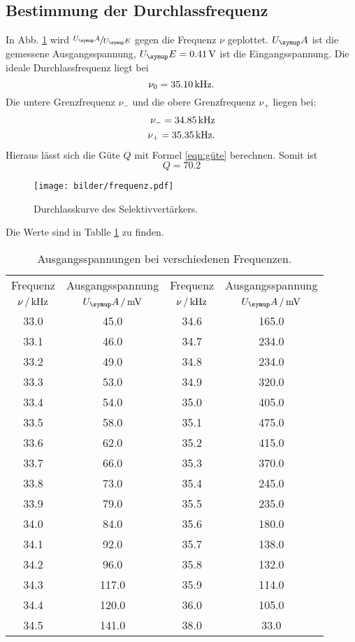 \subsection{Bestimmung der Durchlassfrequenz}
In Abb. \ref{fig:Durchlass} wird $\sfrac{U_\su{A}}{U_\su{E}}$ gegen die Frequenz
$\nu$ geplottet. $U_\su{A}$ ist die gemessene Ausgangsspannung, $U_\su{E} = 0.41\,\si{\volt}$
ist die Eingangsspannung.
Die ideale Durchlassfrequenz liegt bei
\begin{equation}
  \nu_0 = 35.10 \,\si{\kilo\hertz}.
\end{equation}
Die untere Grenzfrequenz $\nu_-$ und die obere Grenzfrequenz $\nu_+$ liegen bei:
\begin{align}
  \nu_- = 34.85 \,\si{\kilo\hertz} \\
  \nu_+ = 35.35 \,\si{\kilo\hertz}.
\end{align}
Hieraus lässt sich die Güte $Q$ mit Formel \eqref{eqn:güte} berechnen. Somit ist
\begin{equation*}
  Q=70.2
\end{equation*}
\begin{figure}[H]
  \centering
  \texttt{[image: bilder/frequenz.pdf]}
  \caption{Durchlasskurve des Selektivvertärkers.}
  \label{fig:Durchlass}
\end{figure}
\newpage
Die Werte sind in Tablle \ref{tab:werte} zu finden.
\begin{table}
  \centering
  \begin{tabular}{cc|cc}
    \toprule
    \multicolumn{1}{c}{Frequenz} & \multicolumn{1}{c|}{Ausgangsspannung} &
    \multicolumn{1}{c}{Frequenz} & \multicolumn{1}{c}{Ausgangsspannung} \\
    {$\nu\,/\,\si{\kilo\hertz}$} & {$U_\su{A}\,/\mV$}& {$\nu\,/\,\si{\kilo\hertz}$} & {$U_\su{A}\,/\mV$} \\
    \midrule
       33.0 &   45.0 & 34.6  &   165.0 \\
       33.1 &   46.0 & 34.7  &   234.0 \\
       33.2 &   49.0 & 34.8  &   234.0 \\
       33.3 &   53.0 & 34.9  &   320.0 \\
       33.4 &   54.0 & 35.0  &   405.0 \\
       33.5 &   58.0 & 35.1  &   475.0 \\
       33.6 &   62.0 & 35.2  &   415.0 \\
       33.7 &   66.0 & 35.3  &   370.0 \\
       33.8 &   73.0 & 35.4  &   245.0 \\
       33.9 &   79.0 & 35.5  &   235.0 \\
       34.0 &   84.0 & 35.6  &   180.0 \\
       34.1 &   92.0 & 35.7  &   138.0 \\
       34.2 &   96.0 & 35.8  &   132.0 \\
       34.3 &  117.0 & 35.9  &   114.0 \\
       34.4 &  120.0 & 36.0  &   105.0 \\
       34.5 &  141.0 & 38.0  &    33.0 \\
  \bottomrule
  \end{tabular}
  \caption{Ausgangsspannungen bei verschiedenen Frequenzen.}
  \label{tab:werte}
\end{table}
\newpage
